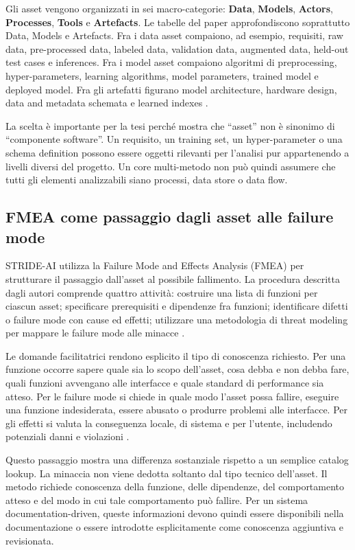 \documentclass[12pt,a4paper,oneside]{report}
\begin{document}
Gli asset vengono organizzati in sei macro-categorie: \textbf{Data}, \textbf{Models}, \textbf{Actors}, \textbf{Processes}, \textbf{Tools} e \textbf{Artefacts}. Le tabelle del paper approfondiscono soprattutto Data, Models e Artefacts. Fra i data asset compaiono, ad esempio, requisiti, raw data, pre-processed data, labeled data, validation data, augmented data, held-out test cases e inferences. Fra i model asset compaiono algoritmi di preprocessing, hyper-parameters, learning algorithms, model parameters, trained model e deployed model. Fra gli artefatti figurano model architecture, hardware design, data and metadata schemata e learned indexes \citep{mauri2022strideai}.

La scelta è importante per la tesi perché mostra che ``asset'' non è sinonimo di ``componente software''. Un requisito, un training set, un hyper-parameter o una schema definition possono essere oggetti rilevanti per l'analisi pur appartenendo a livelli diversi del progetto. Un core multi-metodo non può quindi assumere che tutti gli elementi analizzabili siano processi, data store o data flow.

\subsection{FMEA come passaggio dagli asset alle failure mode}

STRIDE-AI utilizza la Failure Mode and Effects Analysis (FMEA) per strutturare il passaggio dall'asset al possibile fallimento. La procedura descritta dagli autori comprende quattro attività: costruire una lista di funzioni per ciascun asset; specificare prerequisiti e dipendenze fra funzioni; identificare difetti o failure mode con cause ed effetti; utilizzare una metodologia di threat modeling per mappare le failure mode alle minacce \citep{mauri2022strideai}.

Le domande facilitatrici rendono esplicito il tipo di conoscenza richiesto. Per una funzione occorre sapere quale sia lo scopo dell'asset, cosa debba e non debba fare, quali funzioni avvengano alle interfacce e quale standard di performance sia atteso. Per le failure mode si chiede in quale modo l'asset possa fallire, eseguire una funzione indesiderata, essere abusato o produrre problemi alle interfacce. Per gli effetti si valuta la conseguenza locale, di sistema e per l'utente, includendo potenziali danni e violazioni \citep{mauri2022strideai}.

Questo passaggio mostra una differenza sostanziale rispetto a un semplice catalog lookup. La minaccia non viene dedotta soltanto dal tipo tecnico dell'asset. Il metodo richiede conoscenza della funzione, delle dipendenze, del comportamento atteso e del modo in cui tale comportamento può fallire. Per un sistema documentation-driven, queste informazioni devono quindi essere disponibili nella documentazione o essere introdotte esplicitamente come conoscenza aggiuntiva e revisionata.
\end{document}
